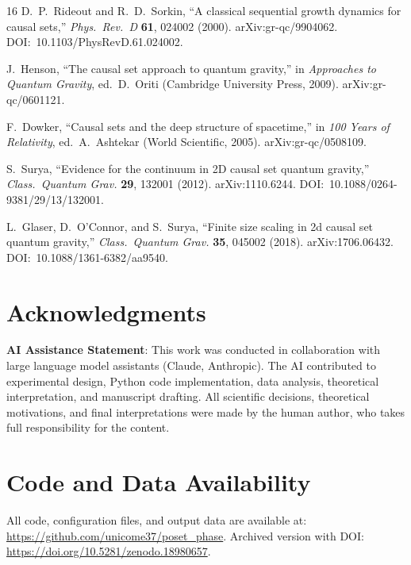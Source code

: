 \documentclass[11pt,a4paper]{article}
\begin{document}
\begin{thebibliography}{16}
D.~P.~Rideout and R.~D.~Sorkin,
``A classical sequential growth dynamics for causal sets,''
\textit{Phys.\ Rev.\ D} \textbf{61}, 024002 (2000).
arXiv:gr-qc/9904062. DOI:~10.1103/PhysRevD.61.024002.

J.~Henson,
``The causal set approach to quantum gravity,''
in \textit{Approaches to Quantum Gravity}, ed.\ D.~Oriti
(Cambridge University Press, 2009). arXiv:gr-qc/0601121.

F.~Dowker,
``Causal sets and the deep structure of spacetime,''
in \textit{100 Years of Relativity}, ed.\ A.~Ashtekar
(World Scientific, 2005). arXiv:gr-qc/0508109.

S.~Surya,
``Evidence for the continuum in 2D causal set quantum gravity,''
\textit{Class.\ Quantum Grav.} \textbf{29}, 132001 (2012).
arXiv:1110.6244. DOI:~10.1088/0264-9381/29/13/132001.

L.~Glaser, D.~O'Connor, and S.~Surya,
``Finite size scaling in 2d causal set quantum gravity,''
\textit{Class.\ Quantum Grav.} \textbf{35}, 045002 (2018).
arXiv:1706.06432. DOI:~10.1088/1361-6382/aa9540.

\end{thebibliography}

\section*{Acknowledgments}

\textbf{AI Assistance Statement}: This work was conducted in collaboration with large language model assistants (Claude, Anthropic). The AI contributed to experimental design, Python code implementation, data analysis, theoretical interpretation, and manuscript drafting. All scientific decisions, theoretical motivations, and final interpretations were made by the human author, who takes full responsibility for the content.

\section*{Code and Data Availability}

All code, configuration files, and output data are available at: \url{https://github.com/unicome37/poset_phase}. Archived version with DOI: \url{https://doi.org/10.5281/zenodo.18980657}.
\end{document}
